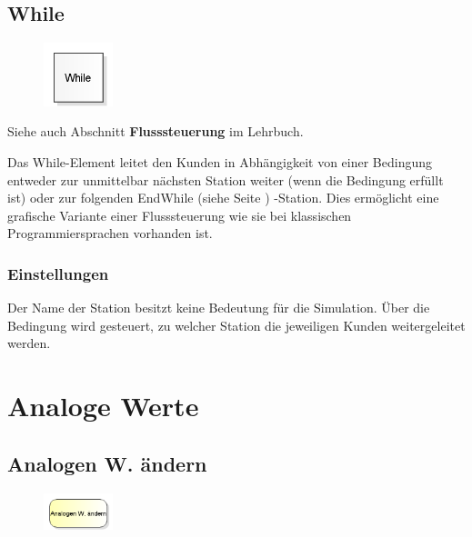 \section{While}
\label{ref:ModelElementLogicWhile}

\begin{figure}
\vspace{-22pt}
\includegraphics[width=2cm]{imageModelElementLogicWhile.png}
\vspace{-22pt}
\end{figure}

Siehe auch Abschnitt \textbf{Flusssteuerung} im Lehrbuch.

Das While-Element leitet den Kunden in Abhängigkeit von einer Bedingung entweder
zur unmittelbar nächsten Station weiter (wenn die Bedingung erfüllt ist) oder
zur folgenden EndWhile (siehe Seite \pageref{ref:ModelElementLogicEndWhile}) -Station.
Dies ermöglicht eine grafische Variante einer Flusssteuerung wie sie bei
klassischen Programmiersprachen vorhanden ist.

\subsection*{Einstellungen}

Der Name der Station besitzt keine Bedeutung für die Simulation. Über die Bedingung
wird gesteuert, zu welcher Station die jeweiligen Kunden weitergeleitet werden.





\chapter{Analoge Werte}

\section{Analogen W. ändern}
\label{ref:ModelElementAnalogAssign}

\begin{figure}
\vspace{-22pt}
\includegraphics[width=2cm]{imageModelElementAnalogAssign.png}
\vspace{-22pt}
\end{figure}

